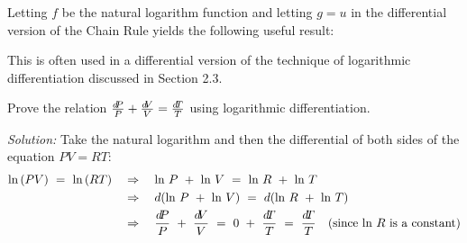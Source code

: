 Letting $f$ be the natural logarithm function and letting $g = u$ in the
differential version of the Chain Rule yields the following useful result:

This is often used in a differential version of the technique of logarithmic
differentiation discussed in Section 2.3.

\begin{exmp}\label{exmp:diff3}
\noindent Prove the relation $\frac{d\negmedspace P}{P} + \frac{d\negmedspace V}{V} = \frac{d\negmedspace T}{T}$
using logarithmic differentiation.\vspace{1mm}
\par\noindent\emph{Solution:} Take the natural logarithm and then the differential
of both sides of the equation $PV = RT$:
\begin{align*}
\ln\,(PV) ~=~ \ln\,(RT) \quad&\Rightarrow\quad
\ln\,P ~+~ \ln\,V ~=~ \ln\,R ~+~ \ln\,T\\
&\Rightarrow\quad d(\ln\,P ~+~ \ln\,V) ~=~ d(\ln\,R ~+~ \ln\,T)\\
&\Rightarrow\quad \frac{d\negmedspace P}{P} ~+~ \frac{d\negmedspace V}{V} ~=~ 0 ~+~ \frac{d\negmedspace T}{T} ~=~ \frac{d\negmedspace T}{T}
\quad\text{(since $\ln\,R$ is a constant)}
\end{align*}
\end{exmp}
